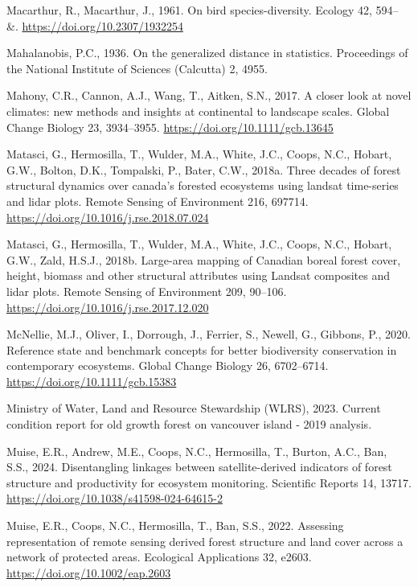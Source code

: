 \documentclass[
]{agujournal2019}
\newlength{\cslhangindent}
\newenvironment{CSLReferences}[2] %
 {\begin{list}{}{%
  \setlength{\itemindent}{0pt}
  \setlength{\leftmargin}{0pt}
  \setlength{\parsep}{0pt}
  \ifodd #1
   \setlength{\leftmargin}{\cslhangindent}
   \setlength{\itemindent}{-1\cslhangindent}
  \fi
  \setlength{\itemsep}{#2\baselineskip}}}
 {\end{list}}
\begin{document}
\begin{CSLReferences}{1}{0}
Macarthur, R., Macarthur, J., 1961. On bird species-diversity. Ecology
42, 594-- \&. \url{https://doi.org/10.2307/1932254}

Mahalanobis, P.C., 1936. On the generalized distance in statistics.
Proceedings of the National Institute of Sciences (Calcutta) 2, 4955.

Mahony, C.R., Cannon, A.J., Wang, T., Aitken, S.N., 2017. A closer look
at novel climates: new methods and insights at continental to landscape
scales. Global Change Biology 23, 3934--3955.
\url{https://doi.org/10.1111/gcb.13645}

Matasci, G., Hermosilla, T., Wulder, M.A., White, J.C., Coops, N.C.,
Hobart, G.W., Bolton, D.K., Tompalski, P., Bater, C.W., 2018a. Three
decades of forest structural dynamics over canada's forested ecosystems
using landsat time-series and lidar plots. Remote Sensing of Environment
216, 697714. \url{https://doi.org/10.1016/j.rse.2018.07.024}

Matasci, G., Hermosilla, T., Wulder, M.A., White, J.C., Coops, N.C.,
Hobart, G.W., Zald, H.S.J., 2018b. Large-area mapping of Canadian boreal
forest cover, height, biomass and other structural attributes using
Landsat composites and lidar plots. Remote Sensing of Environment 209,
90--106. \url{https://doi.org/10.1016/j.rse.2017.12.020}

McNellie, M.J., Oliver, I., Dorrough, J., Ferrier, S., Newell, G.,
Gibbons, P., 2020. Reference state and benchmark concepts for better
biodiversity conservation in contemporary ecosystems. Global Change
Biology 26, 6702--6714. \url{https://doi.org/10.1111/gcb.15383}

Ministry of Water, Land and Resource Stewardship (WLRS), 2023. Current
condition report for old growth forest on vancouver island - 2019
analysis.

Muise, E.R., Andrew, M.E., Coops, N.C., Hermosilla, T., Burton, A.C.,
Ban, S.S., 2024. Disentangling linkages between satellite-derived
indicators of forest structure and productivity for ecosystem
monitoring. Scientific Reports 14, 13717.
\url{https://doi.org/10.1038/s41598-024-64615-2}

Muise, E.R., Coops, N.C., Hermosilla, T., Ban, S.S., 2022. Assessing
representation of remote sensing derived forest structure and land cover
across a network of protected areas. Ecological Applications 32, e2603.
\url{https://doi.org/10.1002/eap.2603}


\end{CSLReferences}
\end{document}
